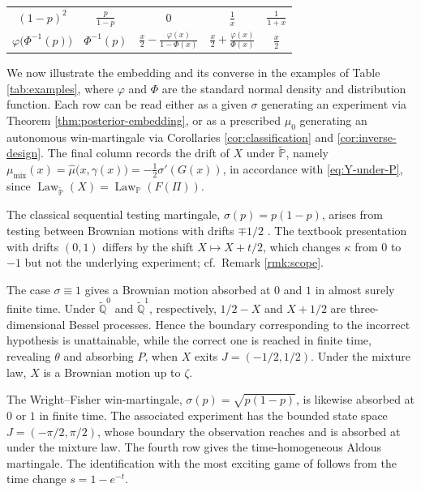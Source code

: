 \documentclass[11pt, reqno]{amsart}
\theoremstyle{plain}
\theoremstyle{remark}
\numberwithin{equation}{section}
\begin{document}
\begin{table}[t]
\begin{tabular}{@{}ccccc@{}}
        $\displaystyle (1-p)^2$
        &
        $\displaystyle \frac{p}{1-p}$
        &
        $\displaystyle 0$
        &
        $\displaystyle \frac1x$
        &
        $\displaystyle \frac{1}{1+x}$
        \\[2ex]

        $\displaystyle \varphi\bigl(\Phi^{-1}(p)\bigr)$
        &
        $\displaystyle \Phi^{-1}(p)$
        &
        $\displaystyle
        \frac{x}{2}
        -\frac{\varphi(x)}{1-\Phi(x)}$
        &
        $\displaystyle
        \frac{x}{2}
        +\frac{\varphi(x)}{\Phi(x)}$
        &
        $\displaystyle \frac{x}{2}$
        \\
        \hline
    \end{tabular}
\end{table}

We now illustrate the embedding and its converse in the examples of Table \ref{tab:examples}, where $\varphi$ and $\Phi$ are the standard normal density and distribution function. Each row can be read either as a given $\sigma$ generating an experiment via Theorem \ref{thm:posterior-embedding}, or as a prescribed $\mu_0$ generating an autonomous win-martingale via Corollaries \ref{cor:classification} and \ref{cor:inverse-design}. 
%
%
%
%
%
The final column records the drift of $X$ under $\widetilde{\mathbb P}$, namely $\mu_{\mathrm{mix}}(x)=\widehat\mu\bigl(x,\gamma(x)\bigr) =-\tfrac12\sigma'(G(x))$, in accordance with \eqref{eq:Y-under-P}, since $\operatorname{Law}_{\widetilde{\mathbb P}}(X) =\operatorname{Law}_{\mathbb P}(F(\Pi))$.

The classical sequential testing martingale, $\sigma(p)=p(1-p)$, arises from testing between Brownian motions with drifts $\mp1/2$ \cite{shiryaev1967two}. The textbook presentation with drifts $(0,1)$ differs by the shift $X\mapsto X+t/2$, which changes $\kappa$ from $0$ to $-1$ but not the underlying experiment; cf.\ Remark \ref{rmk:scope}.

The case $\sigma\equiv1$ gives a Brownian motion absorbed at $0$ and $1$ in almost surely finite time. Under $\widetilde{\mathbb Q}^0$ and $\widetilde{\mathbb Q}^1$, respectively, $1/2-X$ and $X+1/2$ are three-dimensional Bessel processes. Hence the boundary corresponding to the incorrect hypothesis is unattainable, while the correct one is reached in finite time, revealing $\theta$ and absorbing $P$, when $X$ exits $J=(-1/2,1/2)$. Under the mixture law, $X$ is a Brownian motion up to $\zeta$.

The Wright--Fisher win-martingale, $\sigma(p)=\sqrt{p(1-p)}$, is likewise absorbed at $0$ or $1$ in finite time. The associated experiment has the bounded state space $J=(-\pi/2,\pi/2)$, whose boundary the observation reaches and is absorbed at under the mixture law. The fourth row gives the time-homogeneous Aldous martingale. The identification with the most exciting game of \cite{backhoff-beiglbock} follows from the time change $s=1-e^{-t}$.
\end{document}

